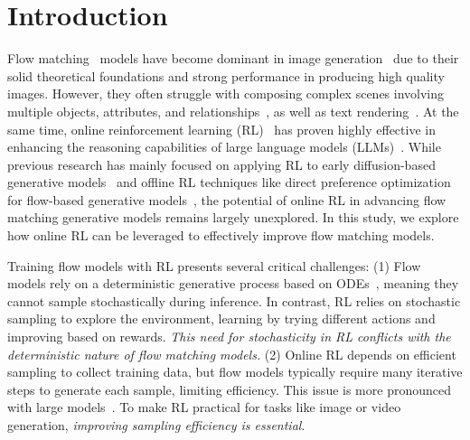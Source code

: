 \section{Introduction}
\label{sec:intro}

Flow matching~\cite{lipman2022flow, rectified_flow} models have become dominant in image generation~\cite{sd3, flux2024} due to their solid theoretical foundations and strong performance in producing high quality images. However, they often struggle with composing complex scenes involving multiple objects, attributes, and relationships~\cite{T2i-compbench, Gpt-imgeval}, as well as text rendering~\cite{textdiffuser}. At the same time, online reinforcement learning (RL)~\cite{sutton1998reinforcement} has proven highly effective in enhancing the reasoning capabilities of large language models (LLMs)~\cite{deepseek_r1, openai_o1}. While previous research has mainly focused on applying RL to early diffusion-based generative models~\cite{ddpo} and offline RL techniques like direct preference optimization~\cite{dpo} for flow-based generative models~\cite{videoalign, skyreels_v2}, the potential of online RL in advancing flow matching generative models remains largely unexplored. In this study, we explore how online RL can be leveraged to effectively improve flow matching models.


Training flow models with RL presents several critical challenges: (1) Flow models rely on a deterministic generative process based on ODEs~\cite{rectified_flow}, meaning they cannot sample stochastically during inference. In contrast, RL relies on stochastic sampling to explore the environment, learning by trying different actions and improving based on rewards. \textit{This need for stochasticity in RL conflicts with the deterministic nature of flow matching models.} 
(2) Online RL depends on efficient sampling to collect training data, but flow models typically require many iterative steps to generate each sample, limiting efficiency. This issue is more pronounced with large models~\cite{flux2024, sd3}. To make RL practical for tasks like image or video generation, \textit{improving sampling efficiency is essential}.

